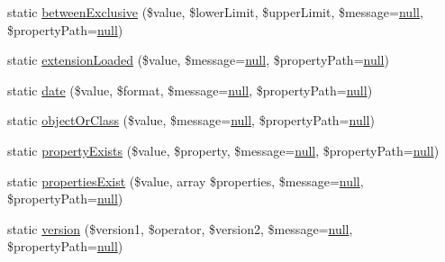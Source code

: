 \begin{DoxyCompactItemize}
\item 
static \mbox{\hyperlink{class_assert_1_1_assertion_ad9ed08a3b033aacaa2fa061281cb992d}{between\+Exclusive}} (\$value, \$lower\+Limit, \$upper\+Limit, \$message=\mbox{\hyperlink{class_assert_1_1_assertion_af95d8b1582dd619cc0159041bc6892c5}{null}}, \$property\+Path=\mbox{\hyperlink{class_assert_1_1_assertion_af95d8b1582dd619cc0159041bc6892c5}{null}})
\item 
static \mbox{\hyperlink{class_assert_1_1_assertion_a643e41c1f1c82748e0bb4a5f13528447}{extension\+Loaded}} (\$value, \$message=\mbox{\hyperlink{class_assert_1_1_assertion_af95d8b1582dd619cc0159041bc6892c5}{null}}, \$property\+Path=\mbox{\hyperlink{class_assert_1_1_assertion_af95d8b1582dd619cc0159041bc6892c5}{null}})
\item 
static \mbox{\hyperlink{class_assert_1_1_assertion_ac2b986481c7280099b92ae64194bccbb}{date}} (\$value, \$format, \$message=\mbox{\hyperlink{class_assert_1_1_assertion_af95d8b1582dd619cc0159041bc6892c5}{null}}, \$property\+Path=\mbox{\hyperlink{class_assert_1_1_assertion_af95d8b1582dd619cc0159041bc6892c5}{null}})
\item 
static \mbox{\hyperlink{class_assert_1_1_assertion_a498ee9a88aef302b9d8cf111cd78803f}{object\+Or\+Class}} (\$value, \$message=\mbox{\hyperlink{class_assert_1_1_assertion_af95d8b1582dd619cc0159041bc6892c5}{null}}, \$property\+Path=\mbox{\hyperlink{class_assert_1_1_assertion_af95d8b1582dd619cc0159041bc6892c5}{null}})
\item 
static \mbox{\hyperlink{class_assert_1_1_assertion_aa4110f2b85ffca7f8097825b9b56a806}{property\+Exists}} (\$value, \$property, \$message=\mbox{\hyperlink{class_assert_1_1_assertion_af95d8b1582dd619cc0159041bc6892c5}{null}}, \$property\+Path=\mbox{\hyperlink{class_assert_1_1_assertion_af95d8b1582dd619cc0159041bc6892c5}{null}})
\item 
static \mbox{\hyperlink{class_assert_1_1_assertion_ac8c31a15b7305f6f35d6831cc44927ce}{properties\+Exist}} (\$value, array \$properties, \$message=\mbox{\hyperlink{class_assert_1_1_assertion_af95d8b1582dd619cc0159041bc6892c5}{null}}, \$property\+Path=\mbox{\hyperlink{class_assert_1_1_assertion_af95d8b1582dd619cc0159041bc6892c5}{null}})
\item 
static \mbox{\hyperlink{class_assert_1_1_assertion_ad5a89801bc495d238ae1a7bbe9a05c82}{version}} (\$version1, \$operator, \$version2, \$message=\mbox{\hyperlink{class_assert_1_1_assertion_af95d8b1582dd619cc0159041bc6892c5}{null}}, \$property\+Path=\mbox{\hyperlink{class_assert_1_1_assertion_af95d8b1582dd619cc0159041bc6892c5}{null}})

\end{DoxyCompactItemize}
